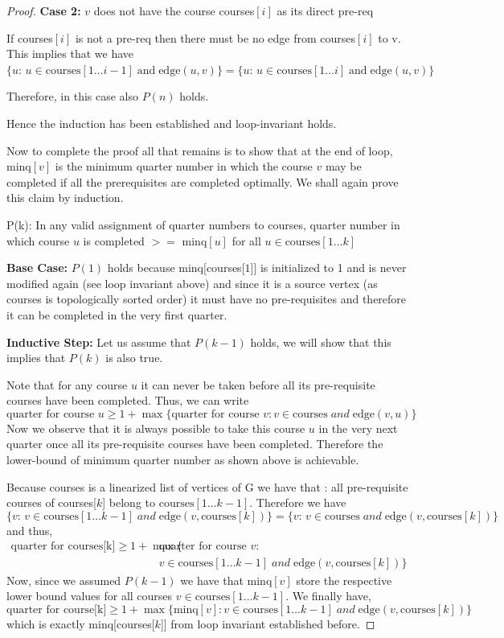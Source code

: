 \documentclass[answers]{exam}
\begin{document}
\begin{questions}
\begin{solution}
\begin{proof}
\textbf{Case 2: } $v$ does not have the course courses$[i]$ as its direct pre-req

If courses$[i]$ is not a pre-req then there must be no edge from courses$[i]$ to v. This implies that we have $\{u:\, u \in \text{courses}[1\ldots i-1] \;\text{and}\; \text{edge}(u, v)\} = \{u:\, u \in \text{courses}[1\ldots i] \;\text{and}\; \text{edge}(u, v)\}$

Therefore, in this case also $P(n)$ holds.

Hence the induction has been established and loop-invariant holds.

Now to complete the proof all that remains is to show that at the end of loop, minq$[v]$ is the minimum quarter number in which the course $v$ may be completed if all the prerequisites are completed optimally. We shall again prove this claim by induction.

P(k): In any valid assignment of quarter numbers to courses, quarter number in which course $u$ is completed $>=$ minq$[u]$ for all $u \in \text{courses}[1\ldots k]$

\textbf{Base Case: } $P(1)$ holds because minq[courses[$1$]] is initialized to 1 and is never modified again (see loop invariant above) and since it is a source vertex (as courses is topologically sorted order) it must have no pre-requisites and therefore it can be completed in the very first quarter.

\textbf{Inductive Step: } Let us assume that $P(k-1)$ holds, we will show that this implies that $P(k)$ is also true.

Note that for any course $u$ it can never be taken before all its pre-requisite courses have been completed. Thus, we can write
\[
    \text{quarter for course }u \geq 1 + \max\{\text{quarter for course }v : v \in \text{courses} \;and\; \text{edge}(v,u)\}
\]
Now we observe that it is always possible to take this course $u$ in the very next quarter once all its pre-requisite courses have been completed. Therefore the lower-bound of minimum quarter number as shown above is achievable.

Because courses is a linearized list of vertices of G we have that : all pre-requisite courses of courses[$k$] belong to $\text{courses}[1\ldots k-1]$. Therefore we have
\[
    \{v:\, v \in \text{courses}[1\ldots k-1] \;and\; \text{edge}(v,\text{courses}[k])\} = \{v:\, v \in \text{courses} \;and\; \text{edge}(v,\text{courses}[k])\}
\]
and thus,
\begin{align*}
    \text{quarter for courses[k]} \geq 1 + \max\{&\text{quarter for course }v :\\
                                                     &v \in \text{courses}[1\ldots k-1] \;and\; \text{edge}(v,\text{courses}[k])\}
\end{align*}
Now, since we assumed $P(k-1)$ we have that minq$[v]$ store the respective lower bound values for all courses $v \in \text{courses}[1\ldots k-1]$. We finally have,
\[
    \text{quarter for course[k]} \geq 1 + \max\{\text{minq}[v] : v \in \text{courses}[1\ldots k-1] \;and\; \text{edge}(v,\text{courses}[k])\}
\]
which is exactly minq[courses[$k$]] from loop invariant established before.


\end{proof}
\end{solution}
\end{questions}
\end{document}
